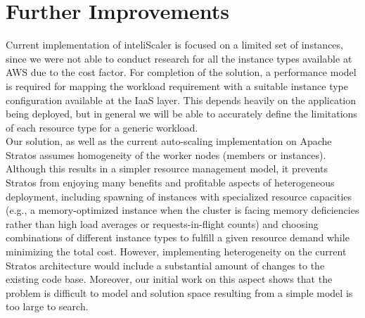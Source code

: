 \section{Further Improvements}
Current implementation of inteliScaler is focused on a limited set of instances, since we were not able to conduct research for all the instance types available at AWS due to the cost factor. For completion of the solution, a performance model is required for mapping the workload requirement with a suitable instance type configuration available at the IaaS layer. This depends heavily on the application being deployed, but in general we will be able to accurately define the limitations of each resource type for a generic workload.\\

Our solution, as well as the current auto-scaling implementation on Apache Stratos assumes homogeneity of the worker nodes (members or instances). Although this results in a simpler resource management model, it prevents Stratos from enjoying many benefits and profitable aspects of heterogeneous deployment, including spawning of instances with specialized resource capacities (e.g., a memory-optimized instance when the cluster is facing memory deficiencies rather than high load averages or requests-in-flight counts) and choosing combinations of different instance types to fulfill a given resource demand while minimizing the total cost. However, implementing heterogeneity on the current Stratos architecture would include a substantial amount of changes to the existing code base. Moreover, our initial work on this aspect shows that the problem is difficult to model and solution space resulting from a simple model is too large to search.\\